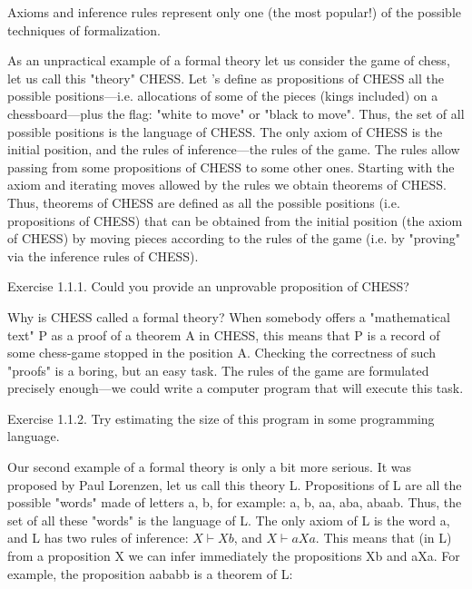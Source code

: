 Axioms and inference rules represent only one (the most popular!) of the possible techniques of formalization.

As an unpractical example of a formal theory let us consider the game of chess, let us call this "theory" CHESS. Let 's define as propositions of CHESS all the possible positions---i.e. allocations of some of the pieces (kings included) on a chessboard---plus the flag: "white to move" or "black to move". Thus, the set of all possible positions is the language of CHESS. The only axiom of CHESS is the initial position, and the rules of inference---the rules of the game. The rules allow passing from some propositions of CHESS to some other ones. Starting with the axiom and iterating moves allowed by the rules we obtain theorems of CHESS. Thus, theorems of CHESS are defined as all the possible positions (i.e. propositions of CHESS) that can be obtained from the initial position (the axiom of CHESS) by moving pieces according to the rules of the game (i.e. by "proving" via the inference rules of CHESS).

Exercise 1.1.1. Could you provide an unprovable proposition of CHESS?

Why is CHESS called a formal theory? When somebody offers a "mathematical text" P as a proof of a theorem A in CHESS, this means that P is a record of some chess-game stopped in the position A.  Checking the correctness of such "proofs" is a boring, but an easy task. The rules of the game are formulated precisely enough---we could write a computer program that will execute this task.

Exercise 1.1.2. Try estimating the size of this program in some programming language.

Our second example of a formal theory is only a bit more serious. It was proposed by Paul Lorenzen, let us call this theory L. Propositions of L are all the possible "words" made of letters a, b, for example: a, b, aa, aba, abaab. Thus, the set of all these "words" is the language of L. The only axiom of L is the word a, and L has two rules of inference: \(X \vdash Xb\), and \(X \vdash aXa\). This means that (in L) from a proposition X we can infer immediately the propositions Xb and aXa. For example, the proposition aababb is a theorem of L:

